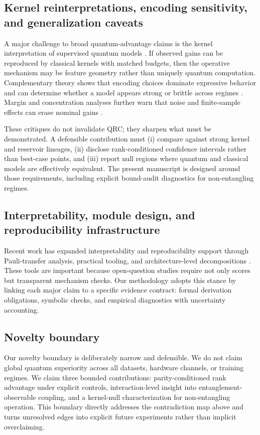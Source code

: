 \subsection{Kernel reinterpretations, encoding sensitivity, and generalization caveats}
A major challenge to broad quantum-advantage claims is the kernel interpretation of supervised quantum models \citep{S006}. If observed gains can be reproduced by classical kernels with matched budgets, then the operative mechanism may be feature geometry rather than uniquely quantum computation. Complementary theory shows that encoding choices dominate expressive behavior and can determine whether a model appears strong or brittle across regimes \citep{S007,S030}. Margin and concentration analyses further warn that noise and finite-sample effects can erase nominal gains \citep{S020,S035}.

These critiques do not invalidate QRC; they sharpen what must be demonstrated. A defensible contribution must (i) compare against strong kernel and reservoir lineages, (ii) disclose rank-conditioned confidence intervals rather than best-case points, and (iii) report null regions where quantum and classical models are effectively equivalent. The present manuscript is designed around those requirements, including explicit bound-audit diagnostics for non-entangling regimes.

\subsection{Interpretability, module design, and reproducibility infrastructure}
Recent work has expanded interpretability and reproducibility support through Pauli-transfer analysis, practical tooling, and architecture-level decompositions \citep{S008,S011,S013,S016,S024,S037}. These tools are important because open-question studies require not only scores but transparent mechanism checks. Our methodology adopts this stance by linking each major claim to a specific evidence contract: formal derivation obligations, symbolic checks, and empirical diagnostics with uncertainty accounting.

\subsection{Novelty boundary}
Our novelty boundary is deliberately narrow and defensible. We do not claim global quantum superiority across all datasets, hardware channels, or training regimes. We claim three bounded contributions: parity-conditioned rank advantage under explicit controls, interaction-level insight into entanglement-observable coupling, and a kernel-null characterization for non-entangling operation. This boundary directly addresses the contradiction map above and turns unresolved edges into explicit future experiments rather than implicit overclaiming.

